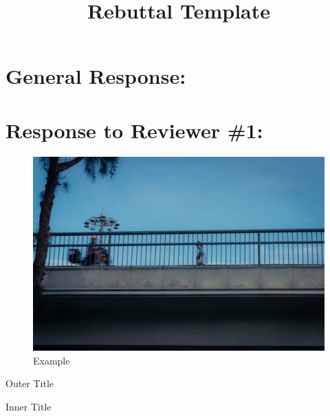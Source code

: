 \documentclass[11pt]{article}
\title{Rebuttal Template}
\date{}
\begin{document}
\maketitle
\onehalfspacing
\section{General Response:}

\lipsum[1]\cite{jiang2023detecting}

\setcounter{CommentCounter}{0} %
\section{Response to Reviewer \#1:}

\reviewercomment{\lipsum[2]}

\begin{response}
\lipsum[3]
\end{response}


\reviewercomment{\lipsum[5]}


\begin{figure}[h]
    \centering
    \includegraphics[width=1\linewidth]{figures/example.jpeg}
    \caption{Example}
    \label{fig:example}
\end{figure}
\begin{response}

    \lipsum[6]
\end{response}

\begin{manuscriptchangeenv}{Outer Title}
    \lipsum[7]
    \begin{manuscriptchangeenv}{Inner Title}
        \lipsum[8]
    \end{manuscriptchangeenv}
\end{manuscriptchangeenv}




\end{document}
